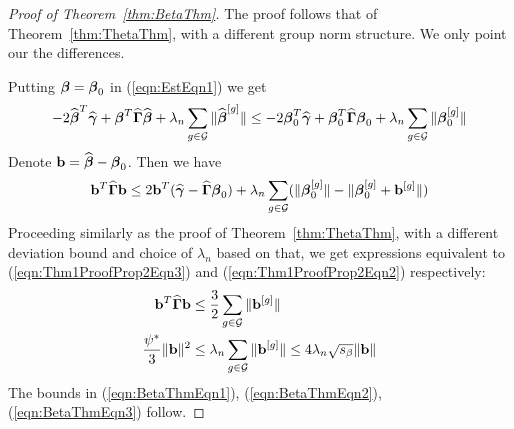 \documentclass[12pt, letterpaper]{article}
\numberwithin{equation}{section}
\begin{document}
\begin{proof}[Proof of Theorem~\ref{thm:BetaThm}]
The proof follows that of Theorem~\ref{thm:ThetaThm}, with a different group norm structure. We only point our the differences.

Putting ${\boldsymbol{\beta}} = {\boldsymbol{\beta}}_0$ in (\ref{eqn:EstEqn1}) we get
%
$$
-2 \widehat {{\boldsymbol{\beta}}}^T \widehat {{\boldsymbol{\gamma}}} + {\boldsymbol{\beta}}^T \widehat {{\boldsymbol{\Gamma}}} \widehat {{\boldsymbol{\beta}}} + \lambda_n \sum_{g \in {\cal{G}}} \| \widehat {{\boldsymbol{\beta}}}^{[g]}  \| \leq
-2 {\boldsymbol{\beta}}_0^T \widehat {{\boldsymbol{\gamma}}} + {\boldsymbol{\beta}}_0^T \widehat {{\boldsymbol{\Gamma}}} {\boldsymbol{\beta}}_0 + \lambda_n \sum_{g \in {\cal{G}}} \| {\boldsymbol{\beta}}_0^{[g]}  \|
$$
%
Denote ${\bf{b}} = \widehat {{\boldsymbol{\beta}}} - {\boldsymbol{\beta}}_0$. Then we have
%
$$
{\bf{b}}^T \widehat {{\boldsymbol{\Gamma}}} {\bf{b}} \leq 2 {\bf{b}}^T ( \widehat {{\boldsymbol{\gamma}}} - \widehat {{\boldsymbol{\Gamma}}} {\boldsymbol{\beta}}_0 ) + \lambda_n
\sum_{g \in {\cal{G}}} ( \| {\boldsymbol{\beta}}_0^{[g]} \| - \| {\boldsymbol{\beta}}_0^{[g]} + {\bf{b}}^{[g]} \|)
$$
%
Proceeding similarly as the proof of Theorem~\ref{thm:ThetaThm}, with a different deviation bound and choice of $\lambda_n$ based on that, we get expressions equivalent to (\ref{eqn:Thm1ProofProp2Eqn3}) and (\ref{eqn:Thm1ProofProp2Eqn2}) respectively:
%
\begin{align}
{\bf{b}}^T \widehat {{\boldsymbol{\Gamma}}} {\bf{b}} & \leq \frac{3}{2} \sum_{g \in {\cal{G}}} \| {\bf{b}}^{[g]} \| \\
\frac{\psi^*}{3} \| {\bf{b}} \|^2 & \leq \lambda_n \sum_{g \in {\cal{G}}} \| {\bf{b}}^{[g]} \| \leq 4 \lambda_n \sqrt{s_\beta} \| {\bf{b}} \|
\end{align}
%
The bounds in (\ref{eqn:BetaThmEqn1}), (\ref{eqn:BetaThmEqn2}), (\ref{eqn:BetaThmEqn3}) %
follow.

\end{proof}
\end{document}
